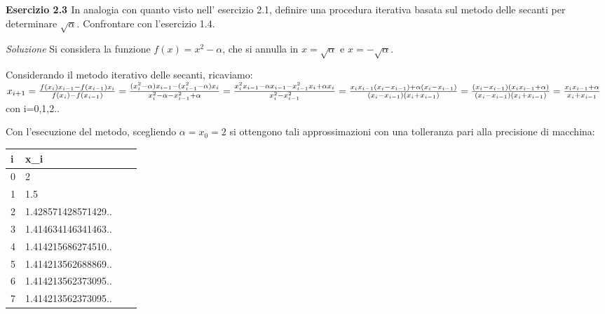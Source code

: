 \documentclass[20pt,a4paper]{book}
\begin{document}
\vspace{10mm}



\textbf{\Large{Esercizio 2.3 }} In analogia con quanto visto nell' esercizio 2.1, definire una procedura iterativa basata sul metodo delle secanti per determinare \begin{math} \sqrt{\alpha} \end{math}. Confrontare con l'esercizio 1.4.

\textit{Soluzione}
Si considera la funzione  \begin{math}f(x)=x^{2}-\alpha\end{math}, che si annulla in \begin{math} x=\sqrt{\alpha}\end{math} e \begin{math} x=-\sqrt{\alpha}\end{math}.

Considerando il metodo iterativo delle secanti, ricaviamo: \\

\begin{math} x_{i+1}=\frac{f(x_{i})x_{i-1}-f(x_{i-1})x_{i}}{f(x_{i})-f(x_{i-1})}=
\frac{(x_{i}^{2}-\alpha)x_{i-1}-(x_{i-1}^{2}-\alpha)x_{i}}{x_{i}^{2}-\alpha-x_{i-1}^{2}+\alpha}=
 \frac{x_{i}^{2}x_{i-1}-\alpha x_{i-1}-x_{i-1}^{2}x_{i}+\alpha x_{i}}{x_{i}^{2}-x_{i-1}^{2}}= \\
\frac{x_{i}x_{i-1}(x_{i}-x_{i-1})+\alpha(x_{i}-x_{i-1})}{(x_{i}-x_{i-1})(x_{i}+x_{i-1})}=
\frac{(x_{i}-x_{i-1})(x_{i}x_{i-1}+\alpha)}{(x_{i}-x_{i-1})(x_{i}+x_{i-1})}=\frac{x_{i}x_{i-1}+\alpha}{x_{i}+x_{i-1}} \end{math}  con i=0,1,2.. 

\vspace{2mm}

Con l'esecuzione del metodo, scegliendo \begin{math} \alpha= x_{0}=2 \end{math} si ottengono tali approssimazioni con una tolleranza pari alla precisione di macchina: \\


\vspace{2mm}

\begin{tabular}{|l|l|l|l|}
\hline
i & x_{i}\\
\hline
0 & 2 \\
\hline
1 & 1.5 \\
\hline
2 & 1.428571428571429.. \\
\hline
3 & 1.414634146341463.. \\
\hline
4 & 1.414215686274510.. \\
\hline
5 & 1.414213562688869.. \\
\hline
6 & 1.414213562373095.. \\
\hline
7 & 1.414213562373095.. \\
\hline
\end{tabular}
\end{document}
